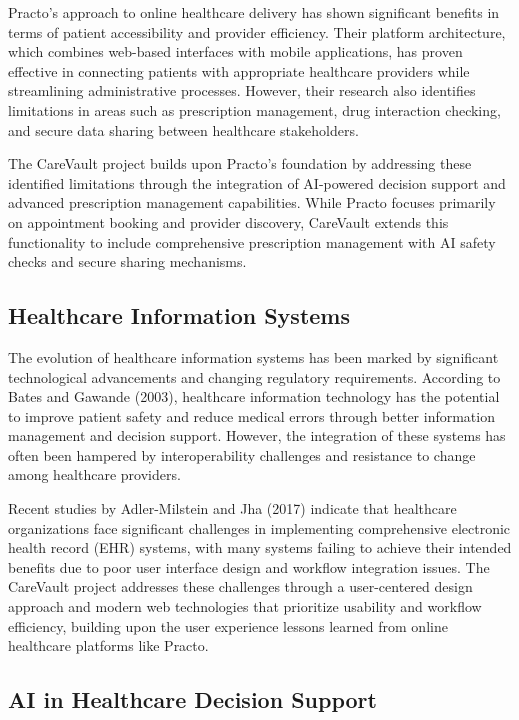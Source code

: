 \documentclass[12pt,a4paper]{article}
\begin{document}
Practo's approach to online healthcare delivery has shown significant benefits in terms of patient accessibility and provider efficiency. Their platform architecture, which combines web-based interfaces with mobile applications, has proven effective in connecting patients with appropriate healthcare providers while streamlining administrative processes. However, their research also identifies limitations in areas such as prescription management, drug interaction checking, and secure data sharing between healthcare stakeholders.

The CareVault project builds upon Practo's foundation by addressing these identified limitations through the integration of AI-powered decision support and advanced prescription management capabilities. While Practo focuses primarily on appointment booking and provider discovery, CareVault extends this functionality to include comprehensive prescription management with AI safety checks and secure sharing mechanisms.

\subsection{Healthcare Information Systems}

The evolution of healthcare information systems has been marked by significant technological advancements and changing regulatory requirements. According to Bates and Gawande (2003), healthcare information technology has the potential to improve patient safety and reduce medical errors through better information management and decision support. However, the integration of these systems has often been hampered by interoperability challenges and resistance to change among healthcare providers.

Recent studies by Adler-Milstein and Jha (2017) indicate that healthcare organizations face significant challenges in implementing comprehensive electronic health record (EHR) systems, with many systems failing to achieve their intended benefits due to poor user interface design and workflow integration issues. The CareVault project addresses these challenges through a user-centered design approach and modern web technologies that prioritize usability and workflow efficiency, building upon the user experience lessons learned from online healthcare platforms like Practo.

\subsection{AI in Healthcare Decision Support}
\end{document}
